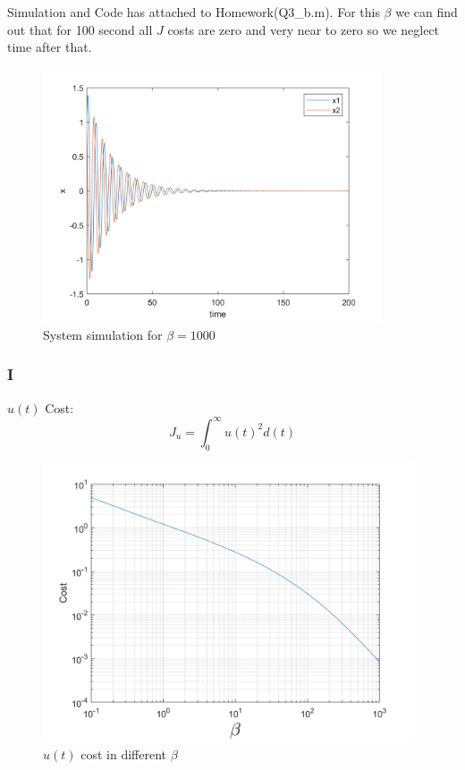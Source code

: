 Simulation and Code has attached to Homework(Q3\_b.m). For this $\beta$ we can find out that for 100 second all $J$ costs are zero and very near to zero so we neglect time after that.
\begin{figure}[H]
	\caption{System simulation for $\beta = 1000$}
	\centering
	\includegraphics[width=10cm]{../Code/Q3/figures/FinalBeta.png}
\end{figure}
\subsubsection{I}
$u(t)$ Cost:
$$J_u = \int_{0}^{\infty} u(t)^2d(t)$$
\begin{figure}[H]
	\caption{$u(t)$ cost in different $\beta$}
	\centering
	\includegraphics[width=11cm]{../Code/Q3/figures/uCost.png}
\end{figure}
